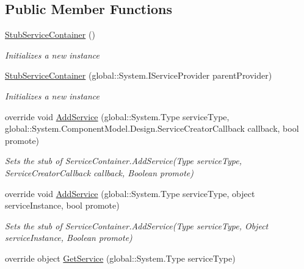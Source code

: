 \subsection*{Public Member Functions}
\begin{DoxyCompactItemize}
\item 
\hyperlink{class_system_1_1_component_model_1_1_design_1_1_fakes_1_1_stub_service_container_aef70eab5afbef1a9e29260cdee2f6bd5}{Stub\-Service\-Container} ()
\begin{DoxyCompactList}\small\item\em Initializes a new instance\end{DoxyCompactList}\item 
\hyperlink{class_system_1_1_component_model_1_1_design_1_1_fakes_1_1_stub_service_container_a63ca9ba8c0939dac77e102e80a7a9e92}{Stub\-Service\-Container} (global\-::\-System.\-I\-Service\-Provider parent\-Provider)
\begin{DoxyCompactList}\small\item\em Initializes a new instance\end{DoxyCompactList}\item 
override void \hyperlink{class_system_1_1_component_model_1_1_design_1_1_fakes_1_1_stub_service_container_a833241cd717eaf0672fd5c7c9ff3bd67}{Add\-Service} (global\-::\-System.\-Type service\-Type, global\-::\-System.\-Component\-Model.\-Design.\-Service\-Creator\-Callback callback, bool promote)
\begin{DoxyCompactList}\small\item\em Sets the stub of Service\-Container.\-Add\-Service(\-Type service\-Type, Service\-Creator\-Callback callback, Boolean promote)\end{DoxyCompactList}\item 
override void \hyperlink{class_system_1_1_component_model_1_1_design_1_1_fakes_1_1_stub_service_container_a67589abf5e37903e1a0800b82e8ad93a}{Add\-Service} (global\-::\-System.\-Type service\-Type, object service\-Instance, bool promote)
\begin{DoxyCompactList}\small\item\em Sets the stub of Service\-Container.\-Add\-Service(\-Type service\-Type, Object service\-Instance, Boolean promote)\end{DoxyCompactList}\item 
override object \hyperlink{class_system_1_1_component_model_1_1_design_1_1_fakes_1_1_stub_service_container_a7d69537ef7c789168b63808998c1153a}{Get\-Service} (global\-::\-System.\-Type service\-Type)

\end{DoxyCompactItemize}
